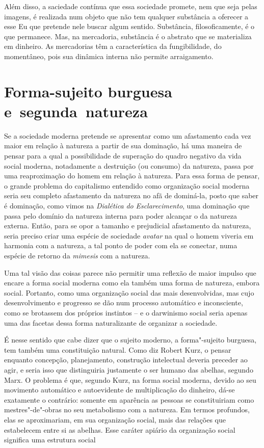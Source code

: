 {Além disso, a saciedade contínua que essa sociedade promete, nem que
seja pelas imagens, é realizada num objeto que não tem qualquer
substância a oferecer a esse Eu que pretende nele buscar algum sentido.
Substância, filosoficamente, é o que permanece. Mas, na mercadoria,
substância é o abstrato que se materializa em dinheiro. As mercadorias
têm a característica da fungibilidade, do momentâneo, pois sua dinâmica
interna não permite arraigamento.

\section{Forma-sujeito burguesa e~segunda~natureza}

Se a sociedade moderna pretende se apresentar como um afastamento cada
vez maior em relação à natureza a partir de sua dominação, há uma
maneira de pensar para a qual a possibilidade de superação do quadro
negativo da vida social moderna, notadamente a destruição (ou consumo)
da natureza, passa por uma reaproximação do homem em relação à natureza.
Para essa forma de pensar, o grande problema do capitalismo entendido
como organização social moderna seria seu completo afastamento da
natureza no afã de dominá-la, posto que saber é dominação, como vimos na
\emph{Dialética} \emph{do} \emph{Esclarecimento}, uma dominação que
passa pelo domínio da natureza interna para poder alcançar o da natureza
externa. Então, para se opor a tamanho e prejudicial afastamento da
natureza, seria preciso criar uma espécie de sociedade \emph{avatar} na
qual o homem viveria em harmonia com a natureza, a tal ponto de poder
com ela se conectar, numa espécie de retorno da \emph{mimesis} com a
natureza.

Uma tal visão das coisas parece não permitir uma reflexão de maior
impulso que encare a forma social moderna como ela também uma forma de
natureza, embora social. Portanto, como uma organização social das mais
desenvolvidas, mas cujo desenvolvimento e progresso se dão num processo
automático e inconsciente, como se brotassem dos próprios instintos -- e
o darwinismo social seria apenas uma das facetas dessa forma
naturalizante de organizar a sociedade.

É nesse sentido que cabe dizer que o sujeito moderno, a forma"-sujeito
burguesa, tem também uma constituição natural. Como diz Robert Kurz, o
pensar enquanto concepção, planejamento, construção intelectual deveria
preceder ao agir, e seria isso que distinguiria justamente o ser humano
das abelhas, segundo Marx. O problema é que, segundo Kurz, na forma
social moderna, devido ao seu movimento automático e autoevidente de
multiplicação do dinheiro, dá-se exatamente o contrário: somente em
aparência as pessoas se constituiriam como mestres"-de"-obras no seu
metabolismo com a natureza. Em termos profundos, elas se aproximariam,
em sua organização social, mais das relações que estabelecem entre si as
abelhas. Esse caráter apiário da organização social significa uma
estrutura social

}
